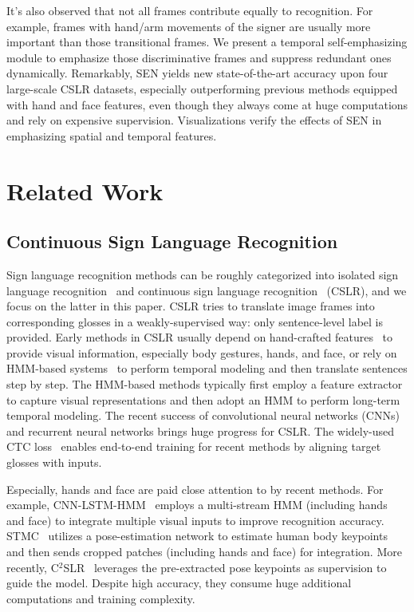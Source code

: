 \documentclass[letterpaper]{article} \usepackage{aaai23}  \usepackage{times}  \usepackage{helvet}  \usepackage{courier}  \usepackage[hyphens]{url}  \usepackage{graphicx} \urlstyle{rm} \def\UrlFont{\rm}  \usepackage{natbib}  \usepackage{caption} \frenchspacing  \setlength{\pdfpagewidth}{8.5in} \setlength{\pdfpageheight}{11in} \usepackage{algorithm}
\begin{document}
It's also observed that not all frames contribute equally to recognition. For example, frames with hand/arm movements of the signer are usually more important than those transitional frames. We present a temporal self-emphasizing module to emphasize those discriminative frames and suppress redundant ones dynamically. Remarkably, SEN yields new state-of-the-art accuracy upon four large-scale CSLR datasets, especially outperforming previous methods equipped with hand and face features, even though they always come at huge computations and rely on expensive supervision. Visualizations verify the effects of SEN in emphasizing spatial and temporal features.

\section{Related Work}
\subsection{Continuous Sign Language Recognition}
Sign language recognition methods can be roughly categorized into isolated sign language recognition~\cite{tunga2021pose,hu2021signbert,hu2021hand} and continuous sign language recognition~\cite{pu2019iterative,cheng2020fully,cui2019deep,niu2020stochastic,Min_2021_ICCV} (CSLR), and we focus on the latter in this paper. CSLR tries to translate image frames into corresponding glosses in a weakly-supervised way: only sentence-level label is provided. Early methods in CSLR usually depend on hand-crafted features~\cite{gao2004chinese,freeman1995orientation} to provide visual information, especially body gestures, hands, and face, or rely on HMM-based systems~\cite{koller2016deepsign,han2009modelling,koller2017re,koller2015continuous} to perform temporal modeling and then translate sentences step by step. The HMM-based methods typically first employ a feature extractor to capture visual representations and then adopt an HMM to perform long-term temporal modeling. The recent success of convolutional neural networks (CNNs) and recurrent neural networks brings huge progress for CSLR. The widely-used CTC loss~\cite{graves2006connectionist} enables end-to-end training for recent methods by aligning target glosses with inputs. 

Especially, hands and face are paid close attention to by recent methods. For example, CNN-LSTM-HMM~\cite{koller2019weakly} employs a multi-stream HMM (including hands and face) to integrate multiple visual inputs to improve recognition accuracy. STMC~\cite{zhou2020spatial} utilizes a pose-estimation network to estimate human body keypoints and then sends cropped patches (including hands and face) for integration. More recently, C$^2$SLR~\cite{zuo2022c2slr} leverages the pre-extracted pose keypoints as supervision to guide the model. Despite high accuracy, they consume huge additional computations and training complexity.
\end{document}
